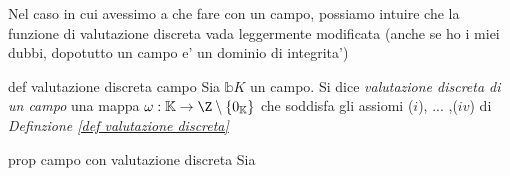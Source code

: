 \noindent Nel caso in cui avessimo a che fare con un campo, possiamo intuire che la funzione di valutazione discreta vada leggermente modificata
(anche se ho i miei dubbi, dopotutto un campo e' un dominio di integrita')

\begin{defn}{def valutazione discreta campo}
  Sia $\mathbb{b}K$ un campo. Si dice \emph{valutazione discreta di un campo} una mappa 
  $\omega : \mathbb{K} \rightarrow \Z \setminus \{ 0_{\mathbb{K}} \}$ che soddisfa gli assiomi ($i$), ... ,($iv$) di 
  \emph{Definzione \ref{def valutazione discreta}} 
\end{defn}

\begin{prop}[]{prop campo con valutazione discreta}
  Sia 
\end{prop}